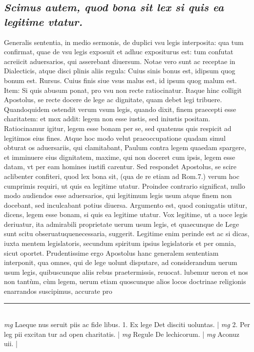 \documentclass{article}
\begin{document}
\begin{pages}
\subsection*{\textit{Scimus autem, quod bona sit lex si quis ea legitime vtatur. }}\pstart Generalis sententia, in medio sermonis, de duplici vsu legis interposita: qua tum confirmat, quae de vsu legis exposuit et adhuc expositurus est: tum confutat acreiicit aduersarios, qui asserebant diuersum. Notae vero sunt ac receptae in Dialecticis, atque  disci plinis aliis regula: Cuius sinis bonus est, idipsum quog bonum est. Rursus. Cuius finis siue vsus malus est, id ipsum quog malum est. Item: Si quis abusum ponat, pro vsu non recte ratiocinatur. Itaque hinc colligit Apostolus, se recte docere de lege ac dignitate, quam debet legi tribuere. Quandoquidem ostendit verum vsum legis, quando dixit, finem praecepti esse charitatem: et mox addit: legem non esse iustis, sed iniustis positam. Ratiocinamur igitur, legem esse bonam per se, sed quatenus quis respicit ad legitimos eius fines. Atque hoc modo velut praeoccupatione quadam simul obturat os aduersariis, qui clamitabant, Paulum contra legem quaedam spargere, et imminuere eius dignitatem, maxime, qui non doceret cum ipsis, legem esse datam, vt per eam homines iustifi carentur. Sed respondet Apostolus, se scire aclibenter confiteri, quod lex bona sit, (qua de re etiam ad Rom.7.) verum hoc cumprimis requiri, ut quis ea legitime utatur. Proindee contrario significat, nullo modo audiendos esse aduersarios, qui legitimum legis usum atque  finem non docebant, sed inculcabant potius diuersa. Argumento est, quod coniugatis utitur, dicens, legem esse bonam, si quis ea legitime utatur. Vox legitime, ut a uoce legis deriuatur, ita admirabili proprietate uerum usum legis, et quaecunque  de Lege sunt scitu obseruatuquenecessaria, suggerit. Legitime enim perinde est ac si dicas, iuxta mentem legislatoris, secundum spiritum ipsius legislatoris et per omnia, sicut oportet. Prudentissime ergo Apostolus hanc generalem sententiam interponit, qua omnes, qui de lege uolunt disputare, ad considerandum uerum usum legis, quibuscunque  aliis rebus praetermissis, reuocat. lubemur ueron et nos non tantùm, cùm legem, uerum etiam quoscunque  alios locos doctrinae religionis enarrandos suscipimus, accurate pro\pend
\vspace{0.5cm}\noindent
\vspace{0.2cm}\rule{1cm}{0.2pt}\\ 
\hspace{0.2cm}\textit{mg}
\footnotesize Laeque nus seruit piis ac fide libus. 1. Ex lege Det disciti uoluntas. 
\normalsize| 
\hspace{0.2cm}\textit{mg}
\footnotesize 2. Per leg pii excitan tur ad open charitatis. 
\normalsize| 
\hspace{0.2cm}\textit{mg}
\footnotesize Regule De lechicorum. 
\normalsize| 
\hspace{0.2cm}\textit{mg}
\footnotesize Aconuz uii. 
\normalsize| 

\end{pages}
\end{document}
